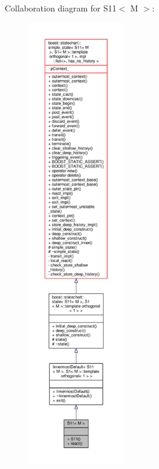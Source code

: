 Collaboration diagram for S11$<$ M $>$\+:
\nopagebreak
\begin{figure}[H]
\begin{center}
\leavevmode
\includegraphics[height=550pt]{struct_s11__coll__graph}
\end{center}
\end{figure}
